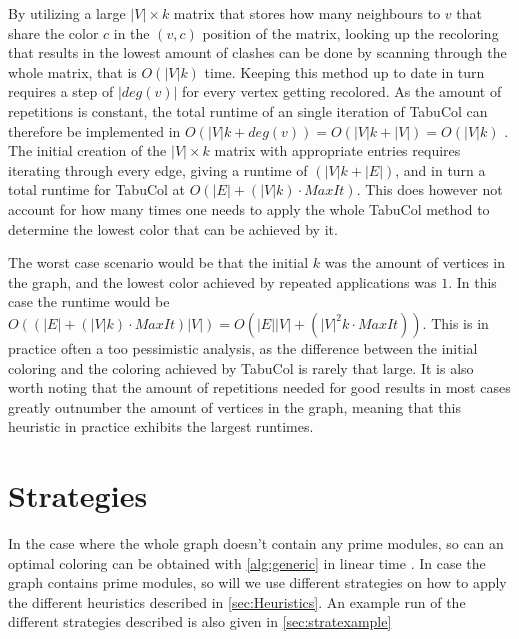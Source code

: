 \documentclass[a4paper]{article}
\begin{document}
By utilizing a large $|V| \times k$ matrix that stores how many neighbours to $v$ that share
the color $c$ in the $(v,c)$ position of the matrix, looking up the recoloring
that results in the lowest amount of clashes can be done by scanning through 
the whole matrix, that is $O(|V|k)$ time.
Keeping this method up to date in turn requires a step of $|deg(v)|$ for every
vertex getting recolored.  As the amount of repetitions is constant, the total
runtime of an single iteration of TabuCol can therefore be implemented in
$O(|V|k+deg(v)) = O(|V|k+|V|) = O(|V|k)$ \cite{Constructive}. The initial
creation of the $|V| \times k$ matrix with appropriate entries requires
iterating through every edge, giving a runtime of $(|V|k+|E|)$, and in turn a 
total runtime for TabuCol at $O(|E|+(|V|k)\cdot MaxIt)$. This does however
not account for how many times one needs to apply the whole TabuCol method to
determine the lowest color that can be achieved by it.

The worst case scenario would be that the initial $k$ was the amount of
vertices in the graph, and the lowest color achieved by repeated applications
was $1$. In this case the runtime would be $O((|E|+(|V|k)\cdot MaxIt)|V|) = O(
|E||V| + (|V|^2k\cdot MaxIt))$. This is in practice often a too
pessimistic analysis, as the difference between the initial coloring and the
coloring achieved by TabuCol is rarely that large. It is also worth noting that
the amount of repetitions needed for good results in most cases greatly
outnumber the amount of vertices in the graph, meaning that this heuristic in
practice exhibits the largest runtimes.

\section{Strategies}
\label{sec:Strategies}
In the case where the whole graph doesn't contain any prime modules, so can an optimal
coloring can be obtained with \autoref{alg:generic} in linear time
\cite{HCL}. In case the graph contains prime modules, so will we use different
strategies on how to apply the different heuristics described in
\autoref{sec:Heuristics}. An example run of the different strategies described
is also given in \autoref{sec:stratexample}
\end{document}
